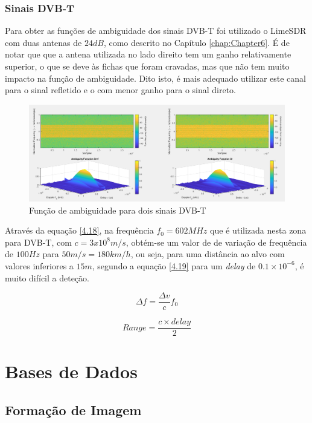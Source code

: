 \subsubsection{Sinais DVB-T}
Para obter as funções de ambiguidade dos sinais \gls{DVB-T} foi utilizado o LimeSDR com duas antenas de $24 dB$, como descrito no Capítulo \ref{chap:Chapter6}. É de notar que que a antena utilizada no lado direito tem um ganho relativamente superior, o que se deve às fichas que foram cravadas, mas que não tem muito impacto na função de ambiguidade. Dito isto, é mais adequado utilizar este canal para o sinal refletido e o com menor ganho para o sinal direto.\par 

\begin{figure}[h]
\centering
\includegraphics[scale=0.35]{chapters/ch4/assets/dvbt}
\caption[Função de ambiguidade para dois sinais DVB-T]{Função de ambiguidade para dois sinais DVB-T}
\label{fig:dvbt}
\end{figure}
 
Através da equação \ref{4.18}, na frequência $f_{0}=602 MHz$ que é utilizada nesta zona para \gls{DVB-T}, com $c=3x10^{8}m/s$, obtém-se um valor de de variação de frequência de $100Hz$ para $50m/s=180km/h$, ou seja, para uma distância ao alvo com valores inferiores a $15m$, segundo a equação \ref{4.19} para um \textit{delay} de $0.1\times 10^{-6}$, é muito difícil a deteção.

\begin{equation} \label{4.18}
\Delta f=\dfrac{\Delta v}{c}f_{0}
\end{equation}

\begin{equation} \label{4.19}
Range=\dfrac{c\times delay}{2}
\end{equation}









\section{Bases de Dados}

\subsection{Formação de Imagem}